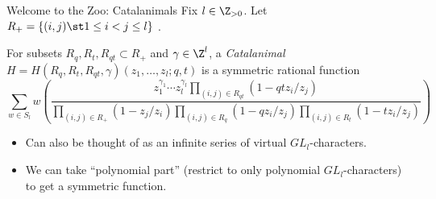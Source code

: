 \documentclass{beamer}
\newcounter{c}
\begin{document}
\begin{frame}{Welcome to the Zoo: Catalanimals}
  Fix \(l \in \Z_{>0}\). Let \(R_+ = \{(i,j) \st 1 \leq i < j \leq l\}\) .\pause
  \begin{definition}
    For subsets \(R_q, R_t, R_{qt} \subset R_+\) and \(\gamma \in
    \Z^l\), a \emph{Catalanimal} \(H = H(R_q,R_t,R_{qt},\gamma)(z_1,\ldots,z_l;q,t)\) is a
    symmetric rational function\pause
    \[
 \sum_{w \in S_l} w \left(
        \frac{z_1^{\gamma_1} \cdots z_l^{\gamma_l} \prod_{(i,j) \in
            R_{qt}} (1 - qt z_i/z_j)}{\prod_{(i,j) \in R_+}
          (1-z_j/z_i) \prod_{(i,j) \in R_q} (1-q z_i/z_j) \prod_{(i,j)
          \in R_t} (1-t z_i/z_j)} \right)
    \]
  \end{definition}
\pause
  \begin{itemize}
  \item Can also be thought of as an infinite series of virtual \(GL_l\)-characters.\pause
  \item We can take ``polynomial part'' (restrict to only polynomial
    \(GL_l\)-characters) to get a symmetric function.
  \end{itemize}
\end{frame}
\end{document}
